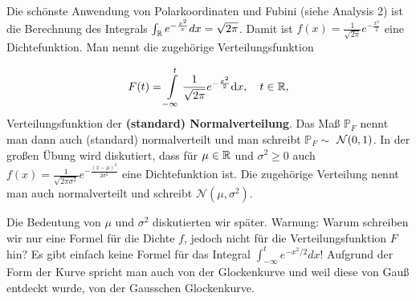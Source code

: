 \begin{beispiel}
	Die sch\"onste Anwendung von Polarkoordinaten und Fubini (siehe Analysis 2) ist die Berechnung des Integrals $\int_{\mathbb{R}} e^{-\frac{x^2}{x}}dx=\sqrt{2\pi}$. Damit ist $f(x)=\frac{1}{\sqrt{2\pi}} e^{-\frac{x^2}{2}}$ eine Dichtefunktion. Man nennt die zugeh\"orige Verteilungsfunktion

	\[ F(t) = \int\limits_{-\infty}^{t} \frac{1}{\sqrt{2\pi}} e^{-\frac{x^2}{2}} \text{d}x,\quad t\in\mathbb{R},\]  Verteilungsfunktion der \textbf{(standard) Normalverteilung}. Das Ma\ss{} $\mathbb P_F$ nennt man dann auch (standard) normalverteilt und man schreibt $\mathbb{P}_F\sim$ \textbf{ $\mathcal{N}(0,1)$}. In der gro\ss en \"Ubung wird diskutiert, dass f\"ur $\mu\in\mathbb{R}$ und $\sigma^2\geq 0$ auch $f(x)=\frac{1}{\sqrt{2\pi\sigma^2}} e^{-\frac{(x-\mu)^2}{2\sigma^2}}$ eine Dichtefunktion ist. Die zugeh\"orige Verteilung nennt man auch normalverteilt und schreibt $\mathcal N(\mu, \sigma^2)$. 
\begin{center}
	\end{center}		
	
	
	Die Bedeutung von $\mu$ und $\sigma^2$ diskutierten wir sp\"ater. Warnung: Warum schreiben wir nur eine Formel f\"ur die Dichte $f$, jedoch nicht f\"ur die Verteilungsfunktion $F$ hin? Es gibt einfach keine Formel f\"ur das Integral $\int_{-\infty}^t e^{-x^2/2}dx$! Aufgrund der Form der Kurve spricht man auch von der Glockenkurve und weil diese von Gau\ss{} entdeckt wurde, von der Gausschen Glockenkurve.
	\end{beispiel}

